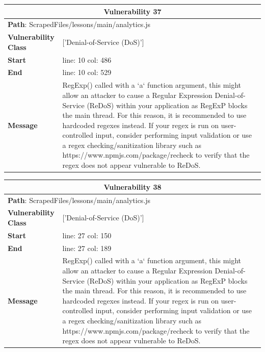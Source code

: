 \documentclass[12pt]{article}
\begin{document}
\vspace{0.7cm}
\FloatBarrier
\begin{table}[!h]
\centering
\renewcommand{\arraystretch}{1.3}
\begin{tabular}{|l|p{10cm}|}
\hline
\multicolumn{2}{|c|}{\textbf{Vulnerability 37}} \\
\hline
\multicolumn{2}{|l|}{\textbf{Path}: ScrapedFiles/lessons/main/analytics.js} \\
\hline
\textbf{Vulnerability Class} & ['Denial-of-Service (DoS)'] \\
\hline
\textbf{Start} & line: 10 \quad col: 486 \\
\hline
\textbf{End} & line: 10 \quad col: 529 \\
\hline
\textbf{Message} & RegExp() called with a `a` function argument, this might allow an attacker to cause a Regular Expression Denial-of-Service (ReDoS) within your application as RegExP blocks the main thread. For this reason, it is recommended to use hardcoded regexes instead. If your regex is run on user-controlled input, consider performing input validation or use a regex checking/sanitization library such as https://www.npmjs.com/package/recheck to verify that the regex does not appear vulnerable to ReDoS. \\
\hline
\end{tabular}
\end{table}
\vspace{0.7cm}
\FloatBarrier
\begin{table}[!h]
\centering
\renewcommand{\arraystretch}{1.3}
\begin{tabular}{|l|p{10cm}|}
\hline
\multicolumn{2}{|c|}{\textbf{Vulnerability 38}} \\
\hline
\multicolumn{2}{|l|}{\textbf{Path}: ScrapedFiles/lessons/main/analytics.js} \\
\hline
\textbf{Vulnerability Class} & ['Denial-of-Service (DoS)'] \\
\hline
\textbf{Start} & line: 27 \quad col: 150 \\
\hline
\textbf{End} & line: 27 \quad col: 189 \\
\hline
\textbf{Message} & RegExp() called with a `a` function argument, this might allow an attacker to cause a Regular Expression Denial-of-Service (ReDoS) within your application as RegExP blocks the main thread. For this reason, it is recommended to use hardcoded regexes instead. If your regex is run on user-controlled input, consider performing input validation or use a regex checking/sanitization library such as https://www.npmjs.com/package/recheck to verify that the regex does not appear vulnerable to ReDoS. \\
\hline
\end{tabular}
\end{table}
\end{document}
